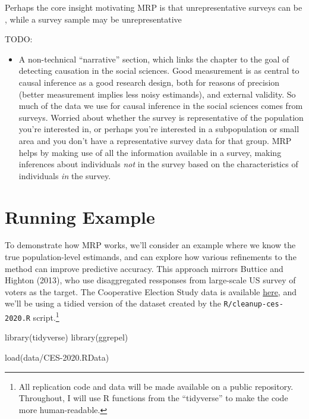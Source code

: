 \documentclass[
]{article}
\newenvironment{Shaded}{\begin{snugshade}}{\end{snugshade}}
\newcommand{\FunctionTok}[1]{\textcolor[rgb]{0.00,0.00,0.00}{#1}}
\newcommand{\NormalTok}[1]{#1}
\newcommand{\StringTok}[1]{\textcolor[rgb]{0.31,0.60,0.02}{#1}}
\providecommand{\tightlist}{%
  \setlength{\itemsep}{0pt}\setlength{\parskip}{0pt}}
\begin{document}
Perhaps the core insight motivating MRP is that unrepresentative surveys
can be , while a survey sample may be unrepresentative

TODO:

\begin{itemize}
\tightlist
\item
  A non-technical ``narrative'' section, which links the chapter to the
  goal of detecting causation in the social sciences. Good measurement
  is as central to causal inference as a good research design, both for
  reasons of precision (better measurement implies less noisy
  estimands), and external validity. So much of the data we use for
  causal inference in the social sciences comes from surveys. Worried
  about whether the survey is representative of the population you're
  interested in, or perhaps you're interested in a subpopulation or
  small area and you don't have a representative survey data for that
  group. MRP helps by making use of all the information available in a
  survey, making inferences about individuals \emph{not} in the survey
  based on the characteristics of individuals \emph{in} the survey.
\end{itemize}

\hypertarget{running-example}{%
\section{Running Example}\label{running-example}}

To demonstrate how MRP works, we'll consider an example where we know
the true population-level estimands, and can explore how various
refinements to the method can improve predictive accuracy. This approach
mirrors Buttice and Highton (2013), who use disaggregated ressponses
from large-scale US survey of voters as the target. The Cooperative
Election Study data is available
\href{https://dataverse.harvard.edu/dataset.xhtml?persistentId=doi\%3A10.7910/DVN/E9N6PH}{here},
and we'll be using a tidied version of the dataset created by the
\texttt{R/cleanup-ces-2020.R} script.\footnote{All replication code and
  data will be made available on a public repository. Throughout, I will
  use R functions from the ``tidyverse'' to make the code more
  human-readable.}

\begin{Shaded}
\begin{Highlighting}[]
\FunctionTok{library}\NormalTok{(tidyverse)}
\FunctionTok{library}\NormalTok{(ggrepel)}

\FunctionTok{load}\NormalTok{(}\StringTok{\textquotesingle{}data/CES{-}2020.RData\textquotesingle{}}\NormalTok{)}
\end{Highlighting}
\end{Shaded}
\end{document}
